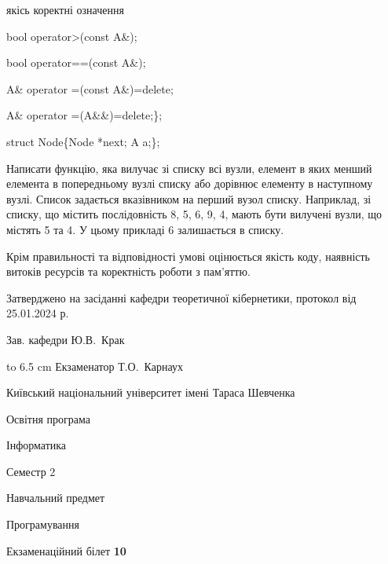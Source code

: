 \documentclass[12pt, ukrainian]{article}
\begin{document}
{\quad  якісь коректні означення 

\quad  bool operator>(const A\&); 

\quad  bool operator==(const A\&); 

\quad A\& operator =(const A\&)=delete; 

\quad  A\& operator =(A\&\&)=delete;\};

struct Node\{Node *next; A a;\};

 Написати функцію, яка вилучає зі списку всі вузли, елемент в яких менший елемента в попередньому вузлі списку або дорівнює елементу в наступному вузлі. Список задається вказівником на перший вузол списку. Наприклад, зі списку, що містить послідовність 8, 5, 6, 9, 4, мають бути вилучені вузли, що містять 5 та 4. У цьому прикладі 6 залишається в списку.

Крім правильності та відповідності умові оцінюється якість коду, наявність витоків ресурсів та коректність роботи з пам'яттю. 

}
{\smallskip\smallskip \begin {scriptsize} Затверджено на засіданні кафедри теоретичної кібернетики, протокол   від   25.01.2024 р.\par\smallskip\smallskip\smallskip\smallskip
{\parbox {6.5 cm} {Зав. кафедри \dotfill Ю.В.~Крак}}\hspace {0.7cm} {\hbox to 6.5 cm { Екзаменатор \dotfill Т.О.~Карнаух}} \end{scriptsize}}
\newpage
{{\begin {scriptsize}\par
{ \center  Київський національний університет імені Тараса Шевченка \par}
{\parbox {5 cm}{Освітня програма \hfill}{\parbox {7 cm}{Інформатика\hfill}}\parbox {6 cm}{\hfill Семестр 2}}\par
{\parbox {5 cm} {Навчальний предмет \hfill}\parbox {7 cm}{Програмування \hfill}\parbox {6cm}{\hfill}\par}\vspace{-15pt} \end{scriptsize}}{\center Екзаменаційний білет \No \textbf { 10 }\par}}
\end{document}
